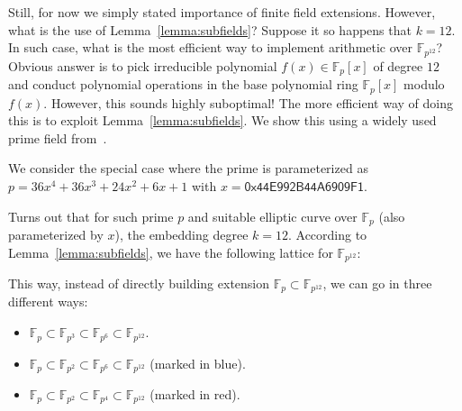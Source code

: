 \documentclass{template}
\begin{document}
Still, for now we simply stated importance of finite field extensions. However,
what is the use of Lemma~\ref{lemma:subfields}? Suppose it so happens that
$k=12$. In such case, what is the most efficient way to implement arithmetic
over $\mathbb{F}_{p^{12}}$? Obvious answer is to pick irreducible polynomial
$f(x) \in \mathbb{F}_{p}[x]$ of degree $12$ and conduct polynomial operations in
the base polynomial ring $\mathbb{F}_p[x]$ modulo $f(x)$. However, this sounds
highly suboptimal! The more efficient way of doing this is to exploit
Lemma~\ref{lemma:subfields}. We show this using a widely used prime field
from~\cite{bn254}.

\begin{example}
    We consider the special case where the prime is parameterized as $p = 36x^4
    + 36x^3 + 24x^2 + 6x + 1$ with $x=\mathsf{0x44E992B44A6909F1}$.

    Turns out that for such prime $p$ and suitable elliptic curve over
    $\mathbb{F}_p$ (also parameterized by $x$), the embedding degree $k=12$.
    According to Lemma~\ref{lemma:subfields}, we have the following lattice for
    $\mathbb{F}_{p^{12}}$:

    \begin{center}
    \end{center}

    This way, instead of directly building extension $\mathbb{F}_p \subset
    \mathbb{F}_{p^{12}}$, we can go in three different ways:
    \begin{itemize}
        \item[\textit{(i)}] $\mathbb{F}_p \subset \mathbb{F}_{p^3} \subset \mathbb{F}_{p^6} \subset \mathbb{F}_{p^{12}}$.
        \item[\textit{(ii)}] $\mathbb{F}_p \subset \mathbb{F}_{p^2} \subset \mathbb{F}_{p^6} \subset \mathbb{F}_{p^{12}}$ (marked in \textcolor{blue!80!black}{blue}).
        \item[\textit{(iii)}] $\mathbb{F}_p \subset \mathbb{F}_{p^2} \subset
        \mathbb{F}_{p^4} \subset \mathbb{F}_{p^{12}}$ (marked in \textcolor{red!80!purple}{red}). 
    \end{itemize}


\end{example}
\end{document}
